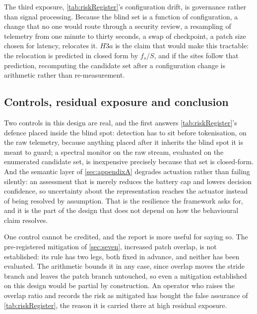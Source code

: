 The third exposure, \autoref{tab:riskRegister}'s configuration drift, is governance rather than signal processing. Because the blind set is a function of configuration, a change that no one would route through a security review, a resampling of telemetry from one minute to thirty seconds, a swap of checkpoint, a patch size chosen for latency, relocates it. $H3a$ is the claim that would make this tractable: the relocation is predicted in closed form by $f_s/S$, and if the sites follow that prediction, recomputing the candidate set after a configuration change is arithmetic rather than re-measurement.

\subsection{Controls, residual exposure and conclusion}

Two controls in this design are real, and the first answers \autoref{tab:riskRegister}'s defence placed inside the blind spot: detection has to sit before tokenisation, on the raw telemetry, because anything placed after it inherits the blind spot it is meant to guard; a spectral monitor on the raw stream, evaluated on the enumerated candidate set, is inexpensive precisely because that set is closed-form. And the semantic layer of \autoref{sec:appendixA} degrades actuation rather than failing silently: an assessment that is merely  reduces the battery cap and lowers decision confidence, so uncertainty about the representation reaches the actuator instead of being resolved by assumption. That is the resilience the framework asks for, and it is the part of the design that does not depend on how the behavioural claim resolves.

One control cannot be credited, and the report is more useful for saying so. The pre-registered mitigation of \autoref{sec:seven}, increased patch overlap, is not established: its rule has two legs, both fixed in advance, and neither has been evaluated. The arithmetic bounds it in any case, since overlap moves the stride branch and leaves the patch branch untouched, so even a mitigation established on this design would be partial by construction. An operator who raises the overlap ratio and records the risk as mitigated has bought the false assurance of \autoref{tab:riskRegister}, the reason it is carried there at high residual exposure.


